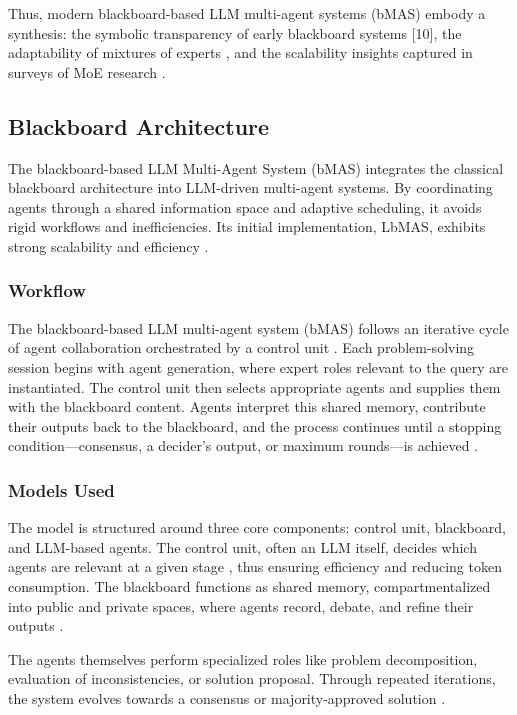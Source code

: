 \documentclass[conference]{IEEEtran}
\begin{document}
Thus, modern blackboard-based LLM multi-agent systems (bMAS) \cite{hanllm} embody a synthesis: the symbolic transparency of early blackboard systems [10], the adaptability of mixtures of experts \cite{amoe}\cite{moe}, and the scalability insights captured in surveys of MoE research \cite{moe}\cite{smoe}.

\subsection{Blackboard Architecture}

The blackboard-based LLM Multi-Agent System (bMAS) integrates the classical blackboard architecture \cite{nii1986blackboard} into LLM-driven multi-agent systems. By coordinating agents through a shared information space and adaptive scheduling, it avoids rigid workflows and inefficiencies. Its initial implementation, LbMAS, exhibits strong scalability and efficiency \cite{hanllm}.

\subsubsection{Workflow}
The blackboard-based LLM multi-agent system (bMAS) follows an iterative cycle of agent collaboration orchestrated by a control unit \cite{nii1986blackboard}. Each problem-solving session begins with agent generation, where expert roles relevant to the query are instantiated. The control unit then selects appropriate agents and supplies them with the blackboard content. Agents interpret this shared memory, contribute their outputs back to the blackboard, and the process continues until a stopping condition---consensus, a decider’s output, or maximum rounds---is achieved \cite{hanllm}.  

\subsubsection{Models Used}
The model is structured around three core components: control unit, blackboard, and LLM-based agents. The control unit, often an LLM itself, decides which agents are relevant at a given stage \cite{hanllm}, thus ensuring efficiency and reducing token consumption. The blackboard functions as shared memory, compartmentalized into public and private spaces, where agents record, debate, and refine their outputs \cite{nii1986blackboard}.  

The agents themselves perform specialized roles like problem decomposition, evaluation of inconsistencies, or solution proposal. Through repeated iterations, the system evolves towards a consensus or majority-approved solution \cite{hanllm}.
\end{document}

